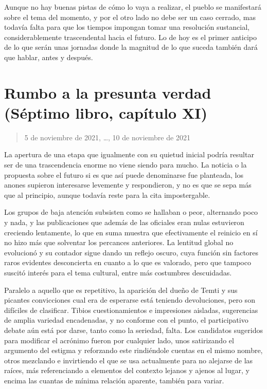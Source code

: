 \documentclass[
]{book}
\begin{document}
Aunque no hay buenas pistas de cómo lo vaya a realizar, el pueblo se manifestará sobre el tema del momento, y por el otro lado no debe ser un caso cerrado, mas todavía falta para que los tiempos impongan tomar una resolución sustancial, considerablemente trascendental hacia el futuro. Lo de hoy es el primer anticipo de lo que serán unas jornadas donde la magnitud de lo que suceda también dará que hablar, antes y después.

\hypertarget{rumbo-a-la-presunta-verdad-suxe9ptimo-libro-capuxedtulo-xi}{%
\section{Rumbo a la presunta verdad (Séptimo libro, capítulo XI)}\label{rumbo-a-la-presunta-verdad-suxe9ptimo-libro-capuxedtulo-xi}}

\begin{quote}
5 de noviembre de 2021, \ldots, 10 de noviembre de 2021
\end{quote}

La apertura de una etapa que igualmente con su quietud inicial podría resultar ser de una trascendencia enorme no viene siendo para mucho. La noticia o la propuesta sobre el futuro si es que así puede denominarse fue planteada, los anones supieron interesarse levemente y respondieron, y no es que se sepa más que al principio, aunque todavía reste para la cita impostergable.

Los grupos de baja atención subsisten como se hallaban o peor, alternando poco y nada, y las publicaciones que además de las oficiales eran nulas estuvieron creciendo lentamente, lo que en suma muestra que efectivamente el reinicio en sí no hizo más que solventar los percances anteriores. La lentitud global no evolucionó y su contador sigue dando un reflejo oscuro, cuya función sin factores raros evidentes desconcierta en cuanto a lo que es valorado, pero que tampoco suscitó interés para el tema cultural, entre más costumbres descuidadas.

Paralelo a aquello que es repetitivo, la aparición del dueño de Temti y sus picantes convicciones cual era de esperarse está teniendo devoluciones, pero son difíciles de clasificar. Tibios cuestionamientos e impresiones aisladas, sugerencias de amplia variedad encadenadas, y no conforme con el punto, el participativo debate aún está por darse, tanto como la seriedad, falta. Los candidatos sugeridos para modificar el acrónimo fueron por cualquier lado, unos satirizando el argumento del estigma y reforzando este rindiéndole cuentas en el mismo nombre, otros mezclando e invirtiendo el que se usa actualmente para no alejarse de las raíces, más referenciando a elementos del contexto lejanos y ajenos al lugar, y encima las cuantas de mínima relación aparente, también para variar.
\end{document}
